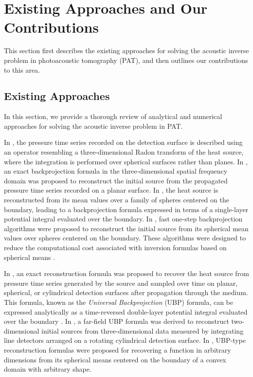 \documentclass[11pt,reqno]{amsart}
\theoremstyle{remark}
\begin{document}
\section{Existing Approaches and Our Contributions}

This section first describes the existing approaches for solving the acoustic inverse problem in photoacoustic tomography (PAT), and then outlines our contributions to this area.

\subsection{Existing Approaches}

In this section, we provide a thorough review of analytical and numerical approaches for solving the acoustic inverse problem in PAT.

In \cite{Kruger1995}, the pressure time series recorded on the detection surface is described using an operator resembling a three-dimensional Radon transform of the heat source, where the integration is performed over spherical surfaces rather than planes. In \cite{Kostli2001}, an exact backprojection formula in the three-dimensional spatial frequency domain was proposed to reconstruct the initial source from the propagated pressure time series recorded on a planar surface. In \cite{Finch2004}, the heat source is reconstructed from its mean values over a family of spheres centered on the boundary, leading to a backprojection formula expressed in terms of a single-layer potential integral evaluated over the boundary. In \cite{Kunyanski2012}, fast one-step backprojection algorithms were proposed to reconstruct the initial source from its spherical mean values over spheres centered on the boundary. These algorithms were designed to reduce the computational cost associated with inversion formulas based on spherical means \cite{Finch2004}.

In \cite{Xu2005}, an exact reconstruction formula was proposed to recover the heat source from pressure time series generated by the source and sampled over time on planar, spherical, or cylindrical detection surfaces after propagation through the medium. This formula, known as the \textit{Universal Backprojection} (UBP) formula, can be expressed analytically as a time-reversed double-layer potential integral evaluated over the boundary \cite{Xu2005}. In \cite{Burgholzer2007b}, a far-field UBP formula was derived to reconstruct two-dimensional initial sources from three-dimensional data measured by integrating line detectors arranged on a rotating cylindrical detection surface. In \cite{Haltmeier2014}, UBP-type reconstruction formulas were proposed for recovering a function in arbitrary dimensions from its spherical means centered on the boundary of a convex domain with arbitrary shape.
\end{document}
